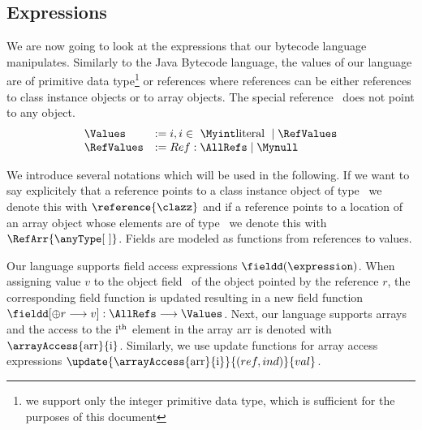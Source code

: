 
\newtheorem{Expression}{Expression}



\subsection{Expressions}\label{lang}

We are now going to look at the expressions that our bytecode language manipulates. 
Similarly to the Java Bytecode language, the values of our language are of primitive data 
type\footnote{ we support only the integer primitive data type, which is sufficient for the purposes of this document} or references
where  references can be either references to class instance objects or to array objects. 
The special reference \Mynull \ does not point to any object.  
$$ \begin{array}{ll}
             \Values & := i, i \in \  \Myint \mbox{\rm literal } \mid \RefValues \\
	     \RefValues & := Ref : \AllRefs \mid \Mynull 
  \end{array} $$


 We introduce several notations which will be used in the following.
 If we want to say explicitely that a reference points to a class instance object of type \clazz \ we denote this with $\reference{\clazz}$ and if
 a reference points to a location of an array object whose elements are of type \anyType \ we denote this
 with $\RefArr{\anyType \lbrack \ \rbrack}$.
 Fields are modeled as functions from references to values. 


 Our language supports field access expressions $\fieldd(\expression)$.
 When assigning value $v$ to the object field \fieldd \ of the object pointed by the reference $r$,
 the  corresponding field function is updated resulting in a new field function $\fieldd[ \oplus r \longrightarrow v]: \AllRefs \longrightarrow \Values $.
 Next, our language supports arrays
 and the access to the $\rm{i^{th}}$ element in the array \textrm{arr} is denoted with $ \arrayAccess{\rm{arr}}{\rm{i}}$.
 Similarly, we use update functions for array access expressions  $ \update{\arrayAccess{\rm{arr}}{\rm{i}}}{ (ref, ind)  } { val}$.

